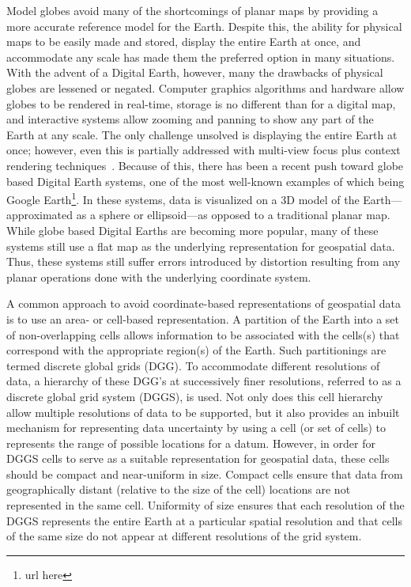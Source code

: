 Model globes avoid many of the shortcomings of planar maps by providing a more accurate reference model for the Earth.
Despite this, the ability for physical maps to be easily made and stored, display the entire Earth at once, and accommodate any scale has made them the preferred option in many situations.
With the advent of a Digital Earth, however, many the drawbacks of physical globes are lessened or negated.
Computer graphics algorithms and hardware allow globes to be rendered in real-time, storage is no different than for a digital map, and interactive systems allow zooming and panning to show any part of the Earth at any scale.
The only challenge unsolved is displaying the entire Earth at once; however, even this is partially addressed with multi-view focus plus context rendering techniques~\cite{mark-sherlock}.
Because of this, there has been a recent push toward globe based Digital Earth systems, one of the most well-known examples of which being Google Earth\footnote{url here}.
In these systems, data is visualized on a 3D model of the Earth---approximated as a sphere or ellipsoid---as opposed to a traditional planar map. While globe based Digital Earths are becoming more popular, many of these systems still use a flat map as the underlying representation for geospatial data.
Thus, these systems still suffer errors introduced by distortion resulting from any planar operations done with the underlying coordinate system.


A common approach to avoid coordinate-based representations of geospatial data is to use an area- or cell-based representation.
A partition of the Earth into a set of non-overlapping cells allows information to be associated with the cells(s) that correspond with the appropriate region(s) of the Earth.
Such partitionings are termed discrete global grids (DGG).
To accommodate different resolutions of data, a hierarchy of these DGG's at successively finer resolutions, referred to as a discrete global grid system (DGGS), is used.
Not only does this cell hierarchy allow multiple resolutions of data to be supported, but it also provides an inbuilt mechanism for representing data uncertainty by using a cell (or set of cells) to represents the range of possible locations for a datum.
However, in order for DGGS cells to serve as a suitable representation for geospatial data, these cells should be compact and near-uniform in size.
Compact cells ensure that data from geographically distant (relative to the size of the cell) locations are not represented in the same cell.
Uniformity of size ensures that each resolution of the DGGS represents the entire Earth at a particular spatial resolution and that cells of the same size do not appear at different resolutions of the grid system.


